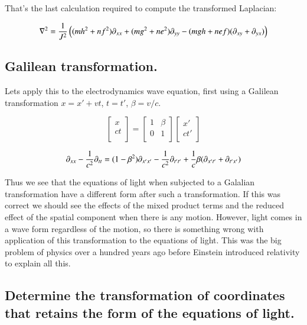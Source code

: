 \documentclass{article}      %
\newcommand{\laplacian}[0]{\nabla^2}
\begin{document}
That's the last calculation required to compute the transformed Laplacian:

\begin{equation}\label{eqn:laplaciantx}
\laplacian = \inv{J^2} 
\left(
(m h^2 + n f^2)\partial_{xx} 
+(m g^2 + n e^2)\partial_{yy} 
-(m g h + n e f)( \partial_{xy} + \partial_{yx}  )
\right)
\end{equation}

\subsection{ Galilean transformation.}

Lets apply this to the electrodynamics wave equation, first using a Galilean transformation $x = x' + v t$, $t = t'$, $\beta = v/c$.

\begin{equation}
\begin{bmatrix}
x \\
ct \\
\end{bmatrix}
=
\begin{bmatrix}
1 & \beta \\
0 & 1 \\
\end{bmatrix}
\begin{bmatrix}
x' \\
c t' \\
\end{bmatrix}
\end{equation}

\begin{equation}
\partial_{xx} -\frac{1}{c^2}\partial_{tt} =
(1 - \beta^2)\partial_{x'x'} 
-\frac{1}{c^2}\partial_{t't'} 
+\frac{1}{c}\beta( \partial_{x't'} + \partial_{t'x'} )
\end{equation}

Thus we see that the equations of light when subjected to a Galalian transformation have a different form after such a
transformation.  If this was correct we should see the effects of the mixed product terms and the reduced effect of the
spatial component when there is any motion.  However, light comes in a wave form regardless of the motion, so there
is something wrong with application of this transformation to the equations of light.  This was the big problem of physics
over a hundred years ago before Einstein introduced relativity to explain all this.

\subsection{ Determine the transformation of coordinates that retains the form of the equations of light. }
\end{document}
